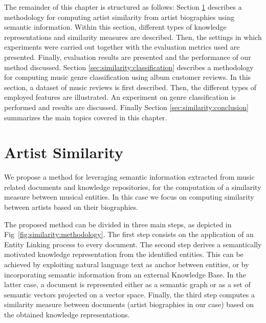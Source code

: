 The remainder of this chapter is structured as follows: Section \ref{sec:similarity:similarity} describes a methodology for computing artist similarity from artist biographies using semantic information. Within this section, different types of knowledge representations and similarity measures are described. Then, the settings in which experiments were carried out together with the evaluation metrics used are presented. Finally, evaluation results are presented and the performance of our method discussed. Section \ref{sec:similarity:classification} describes a methodology for computing music genre classification using album customer reviews. In this section, a dataset of music reviews is first described. Then, the different types of employed features are illustrated. An experiment on genre classification is performed and results are discussed.
Finally Section \ref{sec:similarity:conclusion} summarizes the main topics covered in this chapter.

\section{Artist Similarity}
\label{sec:similarity:similarity}

We propose a method for leveraging semantic information extracted from music related documents and knowledge repositories, for the computation of a similarity measure between musical entities. In this case we focus on computing similarity between artists based on their biographies. 

The proposed method can be divided in three main steps, as depicted in Fig~\ref{fig:similarity:methodology}.
The first step consists on the application of an Entity Linking process to every document. 
The second step derives a semantically motivated knowledge representation from the identified entities. This can be achieved by exploiting natural language text as anchor between entities, or by incorporating semantic information from an external Knowledge Base. In the latter case, a document is represented either as a semantic graph or as a set of semantic vectors projected on a vector space.
Finally, the third step computes a similarity measure between documents (artist biographies in our case) based on the obtained knowledge representations. %


